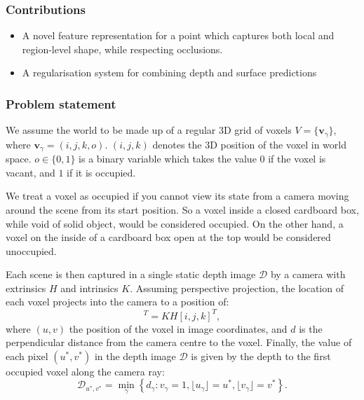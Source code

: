 \documentclass[10pt,twocolumn,letterpaper]{article}
\newcommand{\occ}{o}
\newcommand{\rgbdimage}{\mathcal{D}}
\begin{document}
\subsubsection{Contributions}
\begin{itemize}
\item A novel feature representation for a point which captures both local and region-level shape, while respecting occlusions.
\item A regularisation system for combining depth and surface predictions
\end{itemize}


\subsubsection{Problem statement}

\newcommand{\voxel}{\mathbf{v}}

We assume the world to be made up of a regular 3D grid of voxels $V = \{\voxel_\gamma\}$, where $\voxel_\gamma = (i, j, k, \occ)$.
$(i, j, k)$  denotes the 3D position of the voxel in world space.
$\occ \in \{0, 1\}$ is a binary variable which takes the value $0$ if the voxel is vacant, and $1$ if it is occupied.

We treat a voxel as occupied if you cannot view its state from a camera moving around the scene from its start position.
So a voxel inside a closed cardboard box, while void of solid object, would be considered occupied.
On the other hand, a voxel on the inside of a cardboard box open at the top would be considered unoccupied.

Each scene is then captured in a single static depth image $\rgbdimage$ by a camera with extrinsics $H$ and intrinsics $K$. 
Assuming perspective projection, the location of each voxel projects into the camera to a position of:
\begin{equation}
[u, v, d]^T = K H [i, j, k]^T,
\end{equation}
where $(u,v)$ the position of the voxel in image coordinates, and $d$ is the  perpendicular distance from the camera centre to the voxel.
Finally, the value of each pixel $(u^*, v^*)$ in the depth image $\rgbdimage$ is given by the depth to the first occupied voxel along the camera ray:
\begin{equation}
\rgbdimage_{u^*,v^*} = \min_\gamma \left\{ d_{\gamma} : v_{\gamma} = 1, \lfloor u_{\gamma} \rfloor = u^*, \lfloor v_{\gamma} \rfloor = v^* \right\}.
\label{eqn:minimisation}
\end{equation}
\end{document}
